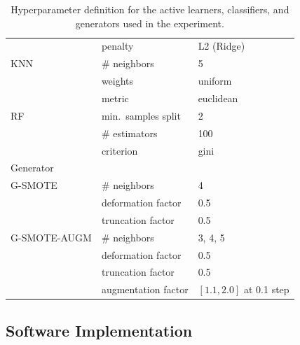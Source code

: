 \begin{table}
\begin{tabular}{lll}
                        & penalty                          & L2 (Ridge)                     \\
		KNN             & \# neighbors                     & 5                              \\
                        & weights                          & uniform                        \\
                        & metric                           & euclidean                      \\
		RF              & min.\ samples split              & 2                              \\
		                & \# estimators                    & 100                            \\
                        & criterion                        & gini                           \\
		\toprule
		Generator       &                                  &                                \\
		\midrule
		G-SMOTE         & \# neighbors                     & 4                              \\
                        & deformation factor               & 0.5                            \\
                        & truncation factor                & 0.5                            \\
		G-SMOTE-AUGM    & \# neighbors                     & 3, 4, 5                        \\
                        & deformation factor               & 0.5                            \\
                        & truncation factor                & 0.5                            \\
                        & augmentation factor              & $[1.1, 2.0]$ at 0.1 step       \\
		\bottomrule
	\end{tabular}
    \caption{\label{tab:grid}
        Hyperparameter definition for the active learners, classifiers,
        and generators used in the experiment.
    }
\end{table}
 
\subsection{Software Implementation}~\label{sec:software_implementation-al-aug}

